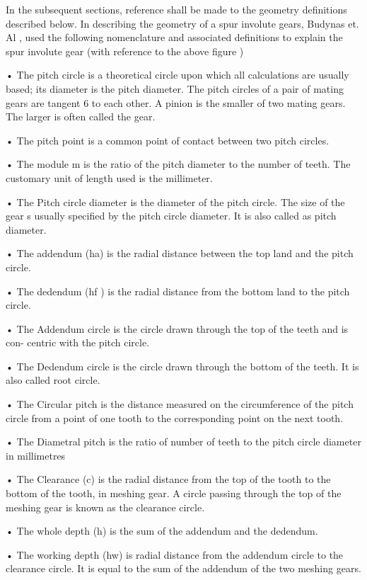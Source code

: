 \documentclass{article}
\begin{document}
  In the subsequent sections, reference shall be made to the geometry definitions described below. In describing the geometry of a spur involute gears, Budynas et. Al \cite{budynas2011shigley9}, used the following nomenclature and associated definitions to explain the spur involute gear (with reference to the above figure )
  
•	The pitch circle is a theoretical circle upon which all calculations are usually based; its diameter is the pitch diameter. The pitch circles of a pair of mating gears are tangent 6 to each other. A pinion is the smaller of two mating gears. The larger is often called the gear.

•	The pitch point is a common point of contact between two pitch circles.

•	The module m is the ratio of the pitch diameter to the number of teeth. The customary unit of length used is the millimeter.

•	The Pitch circle diameter  is the diameter of the pitch circle. The size of the gear s usually specified by the pitch circle diameter. It is also called as pitch diameter.

•	The addendum (ha) is the radial distance between the top land and the pitch circle. 

•	The dedendum (hf ) is the radial distance from the bottom land to the pitch circle. 

•	The Addendum circle  is the circle drawn through the top of the teeth and is con- centric with the pitch circle.

•	The Dedendum circle is the circle drawn through the bottom of the teeth. It is also called root circle.

•	The Circular pitch is the distance measured on the circumference of the pitch circle from a point of one tooth to the corresponding point on the next tooth.

•	The Diametral pitch  is the ratio of number of teeth to the pitch circle diameter in millimetres

•	The Clearance (c) is the radial distance from the top of the tooth to the bottom of the tooth, in meshing gear. A circle passing through the top of the meshing gear is known as the clearance circle.

•	The whole depth (h) is the sum of the addendum and the dedendum. 

•	The working depth (hw) is radial distance from the addendum circle to the clearance circle. It is equal to the sum of the addendum of the two meshing gears.
\end{document}
